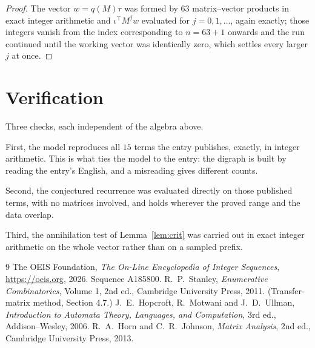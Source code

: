 \documentclass[11pt,a4paper]{article}
\theoremstyle{plain}
\theoremstyle{definition}
\begin{document}
\begin{proof}
The vector $w=q(M)\tau$ was formed by $63$ matrix--vector products in exact integer
arithmetic and $\iota^{\!\top}M^{j}w$ evaluated for $j=0,1,\dots$, again exactly; those
integers vanish from the index corresponding to $n=63+1$ onwards and the run continued
until the working vector was identically zero, which settles every larger $j$ at once.
\end{proof}

\section{Verification}

Three checks, each independent of the algebra above.

First, the model reproduces all $15$ terms the entry publishes, exactly, in integer
arithmetic. This is what ties the model to the entry: the digraph is built by reading the
entry's English, and a misreading gives different counts.

Second, the conjectured recurrence was evaluated directly on those published terms, with no
matrices involved, and holds wherever the proved range and the data overlap.

Third, the annihilation test of Lemma~\ref{lem:crit} was carried out in exact integer
arithmetic on the whole vector rather than on a sampled prefix.

\begin{thebibliography}{9}
 The OEIS Foundation, \emph{The On-Line Encyclopedia of Integer
Sequences}, \url{https://oeis.org}, 2026. Sequence A185800.
 R.~P.~Stanley, \emph{Enumerative Combinatorics}, Volume 1, 2nd ed.,
Cambridge University Press, 2011. (Transfer-matrix method, Section 4.7.)
 J.~E.~Hopcroft, R.~Motwani and J.~D.~Ullman, \emph{Introduction to Automata
Theory, Languages, and Computation}, 3rd ed., Addison--Wesley, 2006.
 R.~A.~Horn and C.~R.~Johnson, \emph{Matrix Analysis}, 2nd ed., Cambridge
University Press, 2013.
\end{thebibliography}
\end{document}
